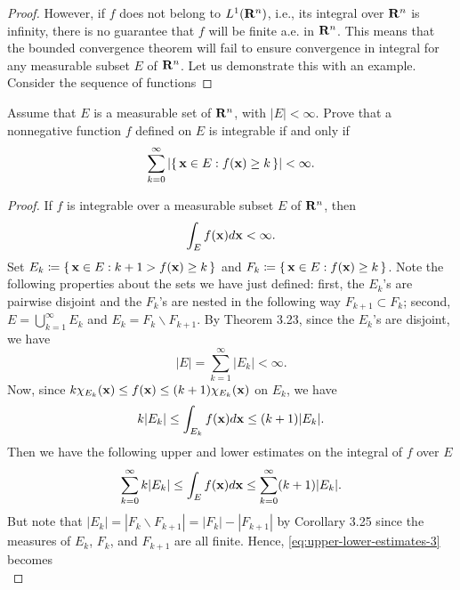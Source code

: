 \begin{proof}
However, if $f$ does not belong to $L^1(\mathbf{R}^n)$, i.e., its integral over
$\mathbf{R}^n$ is infinity, there is no guarantee that $f$ will be finite a.e.\@
in $\mathbf{R}^n$. This means that the bounded convergence theorem will fail to
ensure convergence in integral for any measurable subset $E$ of
$\mathbf{R}^n$. Let us demonstrate this with an example. Consider the sequence of
functions
\end{proof}

\begin{problem}
Assume that $E$ is a measurable set of $\mathbf{R}^n$, with
$|E|<\infty$. Prove that a nonnegative function $f$ defined
on $E$ is integrable if and only if
\[
\sum_{k=0}^\infty\left|\left\{\,\mathbf{x}\in E:f(\mathbf{x})\geq
    k\,\right\}\right|<\infty.
\]
\end{problem}
\begin{proof}
If $f$ is integrable over a measurable subset $E$ of $\mathbf{R}^n$, then
\begin{equation}
\label{eq:integrability-3}
\int_E f(\mathbf{x}) d \mathbf{x}<\infty.
\end{equation}
Set $E_k\coloneqq\left\{\,\mathbf{x}\in E:k+1>f(\mathbf{x})\geq k\,\right\}$ and
$F_k\coloneqq\left\{\,\mathbf{x}\in E:f(\mathbf{x})\geq k\,\right\}$. Note the
following properties about the sets we have just defined: first, the
$E_k$'s are pairwise disjoint and the $F_k$'s are nested in the following
way $F_{k+1}\subset F_k$; second, $E=\bigcup_{k=1}^\infty E_k$ and
$E_k=F_k\smallsetminus F_{k+1}$. By Theorem 3.23, since the $E_k$'s are disjoint,
we have
\begin{equation}
  \label{eq:disjoint-measurable-sets-3}
|E|=\sum_{k=1}^\infty|E_k|<\infty.
\end{equation}
Now, since $k\chi_{E_k}(\mathbf{x})\leq f(\mathbf{x})\leq (k+1)\chi_{E_k}(\mathbf{x})$ on
$E_k$, we have
\begin{equation}
\label{eq:estimates-E-k-3}
k|E_k|\leq\int_{E_k}f(\mathbf{x}) d \mathbf{x}\leq (k+1)|E_k|.
\end{equation}
Then we have the following upper and lower estimates on the integral of $f$
over $E$
\begin{equation}
\label{eq:upper-lower-estimates-3}
\sum_{k=0}^\infty k|E_k|\leq\int_E f(\mathbf{x}) d \mathbf{x}\leq\sum_{k=0}^\infty(k+1)|E_k|.
\end{equation}
But note that $|E_k|=|F_k\smallsetminus F_{k+1}|=|F_k|-|F_{k+1}|$ by Corollary 3.25
since the measures of $E_k$, $F_k$, and $F_{k+1}$ are all finite. Hence,
\eqref{eq:upper-lower-estimates-3} becomes
\begin{equation}
\label{eq:new-upper-lower-estimates-3}

\end{equation}
\end{proof}
